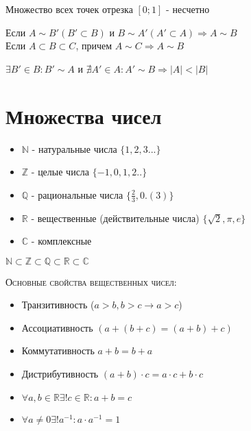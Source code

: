 \documentclass[14pt]{extreport}
\begin{document}
            \begin{theorem}
                Множество всех точек отрезка $[0;1] $ - несчетно
            \end{theorem}

            \begin{theorem}
                Если $A \sim B' (B' \subset  B) $ и $B \sim A' (A' \subset A) \Rightarrow A \sim B$\\
                Если $A \subset B \subset C$, причем $A \sim C \Rightarrow A \sim B$
            \end{theorem}

            \begin{definition}
                $\exists B' \in B: B' \sim A$ и $\nexists A' \in A: A' \sim B \Rightarrow |A| < |B|$
            \end{definition}
        
        \section{Множества чисел}
        \begin{itemize}
            \item $\mathbb{N}$ - натуральные числа $\{1,2,3...\}$
            \item $\mathbb{Z} $ - целые числа $\{-1, 0, 1, 2..\}$ 
            \item $\mathbb{Q}$ - рациональные числа $\{\frac{2}{3},0.(3)\}$
            \item $\mathbb{R}$ - вещественные (действительные числа) $\{\sqrt{2}, \pi, e \}$
            \item $\mathbb{C} $ - комплексные 
        \end{itemize}
        $\mathbb{N} \subset \mathbb{Z} \subset \mathbb{Q} \subset \mathbb{R} \subset \mathbb{C}$
        
        \textsc{Основные свойства вещественных чисел:}
        \begin{itemize}
            \item Транзитивность ($a>b, b>c \rightarrow a > c$)
            \item Ассоциативность $(a+(b+c) = (a+b)+c)$
            \item Коммутативность $a+b = b+a$
            \item Дистрибутивность $(a+b)\cdot c = a \cdot c + b \cdot c$
            \item $\forall a,b \in \mathbb{R} \exists ! c \in \mathbb{R}: a+b=c$
            \item $\forall a \neq 0 \exists! a^{-1}: a \cdot a^{-1} = 1$
        \end{itemize}
            
\end{document}
